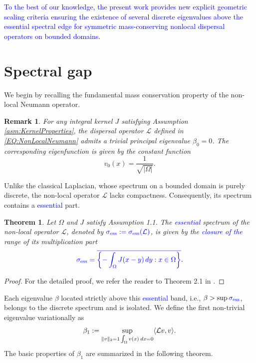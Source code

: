 \documentclass[12pt, a4paper]{article}
\newcommand{\revision}[1]{\textcolor{blue}{#1}}
\theoremstyle{break}
\newtheorem{thm}{Theorem}[section]
\theoremstyle{break}
\theoremstyle{break}
\theoremstyle{break}
\newtheorem{rem}{Remark}[section]
\theoremstyle{break}
\theoremstyle{break}
\theoremstyle{break}
\theoremstyle{break}
\theoremstyle{break}
\begin{document}
\revision{To the best of our knowledge, the present work provides new explicit geometric scaling criteria ensuring the existence of several discrete eigenvalues above the essential spectral edge for symmetric mass-conserving nonlocal dispersal operators on bounded domains.}

\section{Spectral gap}

We begin by recalling the fundamental mass conservation property of the non-local Neumann operator.

\begin{rem}
    For any integral kernel $J$ satisfying Assumption \ref{asm:KernelProperties}, the dispersal operator $\mathcal{L}$ defined in \eqref{EQ:NonLocalNeumann} admits a trivial principal eigenvalue $\beta_0 = 0$. The corresponding eigenfunction is given by the constant function 
    \begin{equation}
        v_0(x) = \frac{1}{\sqrt{|\Omega|}}.
    \end{equation}
\end{rem}

Unlike the classical Laplacian, whose spectrum on a bounded domain is purely discrete, the non-local operator $\mathcal{L}$ lacks compactness. Consequently, its spectrum contains a \revision{essential} part.

\begin{thm}
    \label{thm:contninous_spectrum}
    Let $\Omega$ and $J$ satisfy Assumption 1.1. The \revision{essential} spectrum of the non-local operator $\mathcal{L}$, denoted by $\revision{\sigma_{\mathrm{ess}} := \sigma_{\mathrm{ess}}(\mathcal{L})}$, is given by the \revision{closure of the} range of its multiplication part
    \begin{equation}
        \revision{\sigma_{\mathrm{ess}} = \overline{\left\{ -\int_\Omega J(x-y) \,dy : x \in \Omega \right\}}}.
    \end{equation}
\end{thm}
\begin{proof}
    For the detailed proof, we refer the reader to Theorem 2.1 in \cite{Tadej2025}.
\end{proof}
Each eigenvalue $\beta$ located strictly above this \revision{essential} band, i.e., $\beta > \sup \revision{\sigma_{\mathrm{ess}}}$, belongs to the discrete spectrum and is isolated. We define the first non-trivial eigenvalue variationally as
\begin{equation}\label{eq:beta1_def}
    \beta_1 := \sup_{\|v\|_2 = 1 \\ \int_\Omega v(x) \:dx = 0} \langle \mathcal{L}v, v \rangle.
\end{equation}
The basic properties of $\beta_1$ are summarized in the following theorem.
\end{document}
